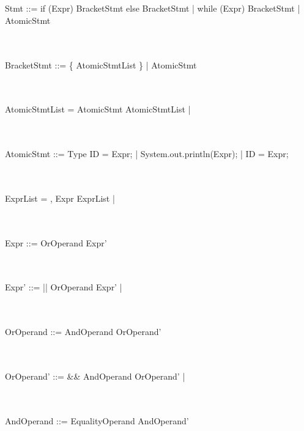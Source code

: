\documentclass[a4paper,portrait,12pt]{article}
\begin{document}
\\~\\
Stmt ::=	if (Expr) BracketStmt else BracketStmt	\newline
\hspace*{.625in} | while (Expr) BracketStmt		\newline
\hspace*{.625in} | AtomicStmt

\\~\\
BracketStmt ::=	\{ AtomicStmtList \}			\newline
\hspace*{.625in} | AtomicStmt

\\~\\
AtomicStmtList =	AtomicStmt AtomicStmtList	\newline
\hspace*{.625in} | \epsilon

\\~\\
AtomicStmt ::= Type ID = Expr;					\newline
\hspace*{.625in} | System.out.println(Expr);	\newline
\hspace*{.625in} | ID = Expr;

\\~\\
ExprList =	, Expr ExprList	\newline
\hspace*{.625in} | \epsilon

\\~\\
Expr ::=	OrOperand Expr'

\\~\\
Expr' ::=	|| OrOperand Expr'				\newline
\hspace*{.625in} | \epsilon

\\~\\
OrOperand ::=	AndOperand OrOperand'

\\~\\
OrOperand' ::=	\&\& AndOperand OrOperand'				\newline
\hspace*{.625in} | \epsilon


\\~\\
AndOperand ::=	EqualityOperand	AndOperand'
\end{document}
